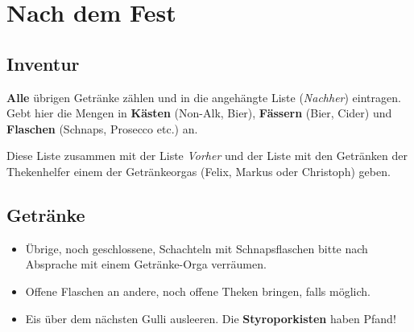 \section{Nach dem Fest}
\subsection{Inventur}
\textbf{Alle} übrigen Getränke zählen und in die angehängte Liste (\emph{Nachher}) eintragen. Gebt hier die Mengen in \textbf{Kästen} (Non-Alk, Bier), \textbf{Fässern} (Bier, Cider) und \textbf{Flaschen} (Schnaps, Prosecco etc.) an.

Diese Liste zusammen mit der Liste \emph{Vorher} und der Liste mit den Getränken der Thekenhelfer einem der Getränkeorgas (Felix, Markus oder Christoph) geben.
\subsection{Getränke}
\begin{itemize}
  \item Übrige, noch geschlossene, Schachteln mit Schnapsflaschen bitte nach Absprache mit einem Getränke-Orga verräumen.
  \item Offene Flaschen an andere, noch offene Theken bringen, falls möglich.
  \item Eis über dem nächsten Gulli ausleeren. Die \textbf{Styroporkisten} haben Pfand!
\end{itemize}

